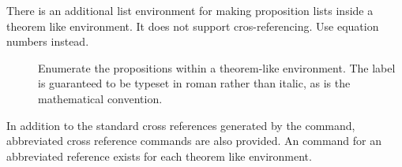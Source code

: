 \documentclass[11pt,a4paper,oneside,titlepage]{alb-corp}
\begin{document}
There is an additional list environment for making proposition lists
inside a theorem like environment.  It does not support
cros-referencing.  Use equation numbers instead.

\begin{description}
\item[] Enumerate the propositions within a
  theorem-like environment.  The label is guaranteed to be typeset in
  roman rather than italic, as is the mathematical convention.
\end{description}

In addition to the standard cross references generated by the
 command, abbreviated cross reference commands are also
provided.  An command for an abbreviated reference exists for each
theorem like environment.
\end{document}
